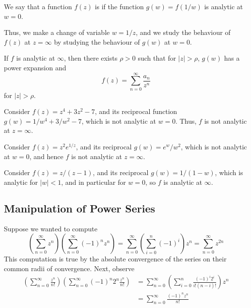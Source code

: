 \begin{definition}
    We say that a function $f(z)$ is  if the function $g(w) = f(1/w)$ is analytic at $w = 0$.
\end{definition}

Thus, we make a change of variable $w = 1/z$, and we study the behaviour of $f(z)$ at $z = \infty$ by studying the behaviour of $g(w)$ at $w = 0$.

\begin{theorem}
    If $f$ is analytic at $\infty$, then there exists $\rho > 0$ such that for $|z| > \rho$, $g(w)$ has a power expansion and  \begin{equation*}
        f(z) = \sum_{n=0}^{\infty}\frac{a_n}{z^n}
    \end{equation*}
    for $|z| > \rho$.
\end{theorem}


\begin{example}
    Consider $f(z) = z^4 + 3z^2-7$, and its reciprocal function $g(w) = 1/w^4 + 3/w^2 - 7$, which is not analytic at $w = 0$. Thus, $f$ is not analytic at $z = \infty$.
\end{example}

\begin{example}
    Consider $f(z) = z^2e^{1/z}$, and its reciprocal $g(w) = e^w/w^2$, which is not analytic at $w = 0$, and hence $f$ is not analytic at $z = \infty$.
\end{example}

\begin{example}
    Consider $f(z) = z/(z-1)$, and its reciprocal $g(w) = 1/(1-w)$, which is analytic for $|w| < 1$, and in particular for $w = 0$, so $f$ is analytic at $\infty$. 
\end{example}


\subsection{Manipulation of Power Series}

\begin{example}
    Suppose we wanted to compute $$\left(\sum_{n=0}^{\infty}z^n\right)\left(\sum_{n=0}^{\infty}(-1)^nz^n\right) = \sum_{n=0}^{\infty}\left(\sum_{i=0}^n(-1)^i\right)z^n = \sum_{n=0}^{\infty}z^{2n}$$
    This computation is true by the absolute convergence of the series on their common radii of convergence. Next, observe \begin{align*}
        \left(\sum_{n=0}^{\infty}\frac{z^n}{n!}\right)\left(\sum_{n=0}^{\infty}(-1)^n2^n\frac{z^n}{n!}\right) &= \sum_{n=0}^{\infty}\left(\sum_{i=0}^n\frac{(-1)^i2^i}{i!(n-i)!}\right)z^n \\
        &= \sum_{n=0}^{\infty}\frac{(-1)^nz^n}{n!}
    \end{align*}
\end{example}

